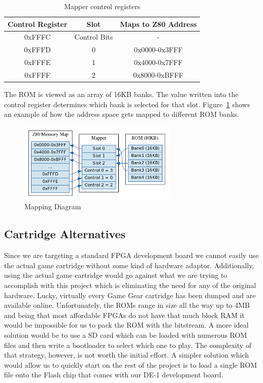 \documentclass{article}
\begin{document}
\begin{table}[H]
    \centering
    \begin{tabular}{|c|c|c|}
        \hline
        \textbf{Control Register} & \textbf{Slot} & \textbf{Maps to Z80 Address} \\ \hline
        0xFFFC           & Control Bits & -              \\ \hline
        0xFFFD           & 0            & 0x0000-0x3FFF  \\ \hline
        0xFFFE           & 1            & 0x4000-0x7FFF  \\ \hline
        0xFFFF           & 2            & 0x8000-0xBFFF  \\
        \hline
    \end{tabular}
    \caption{Mapper control registers \protect\cite{mapper}}
\end{table}

The ROM is viewed as an array of 16KB banks. The value written into the control
register determines which bank is selected for that slot.
Figure~\ref{fig:mapping_diagram} shows an example of how the address space gets
mapped to different ROM banks.

\begin{figure}[H]
\centering
\includegraphics[height=1.5in]{mapper.png}
\caption{Mapping Diagram}
\label{fig:mapping_diagram}
\end{figure}

\subsection{Cartridge Alternatives}
Since we are targeting a standard FPGA development board we cannot easily use
the actual game cartridge without some kind of hardware adaptor.  Additionally,
using the actual game cartridge would go against what we are trying to
accomplish with this project which is eliminating the need for any of the
original hardware. Lucky, virtually every Game Gear cartridge has been dumped
and are available online.  Unfortunately, the ROMs range in size all the way up
to 4MB and being that most affordable FPGAs do not have that much block RAM it
would be impossible for us to pack the ROM with the bitstream. A more ideal
solution would be to use a SD card which can be loaded with numerous ROM files
and then write a bootloader to select which one to play.  The complexity of
that strategy, however, is not worth the initial effort. A simpler solution
which would allow us to quickly start on the rest of the project is to load a
single ROM file onto the Flash chip that comes with our DE-1 development board.
\end{document}
